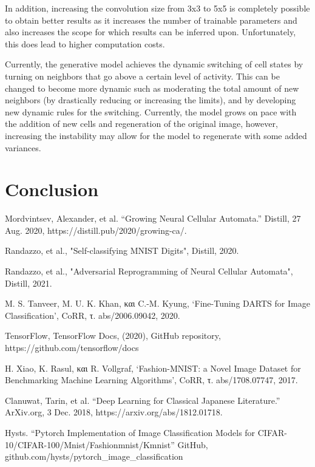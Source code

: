 \documentclass[conference]{IEEEtran}
\begin{document}
In addition, increasing the convolution size from 3x3 to 5x5 is completely possible to obtain better results as it increases the number of trainable parameters and also increases the scope for which results can be inferred upon. Unfortunately, this does lead to higher computation costs.

Currently, the generative model achieves the dynamic switching of cell states by turning on neighbors that go above a certain level of activity. This can be changed to become more dynamic such as moderating the total amount of new neighbors (by drastically reducing or increasing the limits), and by developing new dynamic rules for the switching. Currently, the model grows on pace with the addition of new cells and regeneration of the original image, however, increasing the instability may allow for the model to regenerate with some added variances.

\section{Conclusion}


\begin{thebibliography}{00}

 Mordvintsev, Alexander, et al. “Growing Neural Cellular Automata.” Distill, 27 Aug. 2020, https://distill.pub/2020/growing-ca/. 

 Randazzo, et al., "Self-classifying MNIST Digits", Distill, 2020.

 Randazzo, et al., "Adversarial Reprogramming of Neural Cellular Automata", Distill, 2021.

 M. S. Tanveer, M. U. K. Khan, και C.-M. Kyung, ‘Fine-Tuning DARTS for Image Classification’, CoRR, τ. abs/2006.09042, 2020.

 TensorFlow, TensorFlow Docs, (2020), GitHub repository, https://github.com/tensorflow/docs

 H. Xiao, K. Rasul, και R. Vollgraf, ‘Fashion-MNIST: a Novel Image Dataset for Benchmarking Machine Learning Algorithms’, CoRR, τ. abs/1708.07747, 2017.

 Clanuwat, Tarin, et al. “Deep Learning for Classical Japanese Literature.” ArXiv.org, 3 Dec. 2018, https://arxiv.org/abs/1812.01718. 

  Hysts. “Pytorch Implementation of Image Classification Models for CIFAR-10/CIFAR-100/Mnist/Fashionmnist/Kmnist” GitHub, github.com/hysts/pytorch\_image\_classification

\end{thebibliography}
\end{document}
